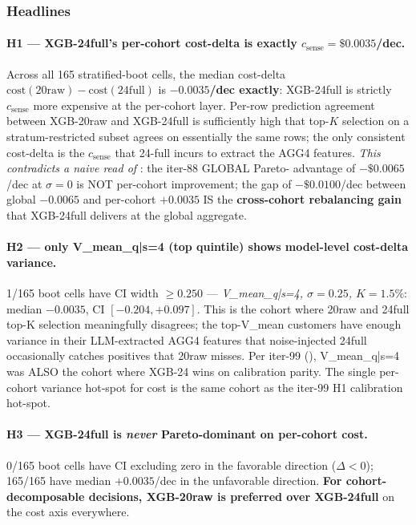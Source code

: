 \subsubsection{Headlines}

\paragraph{H1 --- XGB-24full's per-cohort cost-delta is exactly $c_\text{sense}{=}\$0.0035$/dec.}
Across all 165 stratified-boot cells, the median cost-delta
$\mathrm{cost}(\text{20raw}) - \mathrm{cost}(\text{24full})$ is
\textbf{$-0.0035$/dec exactly}: XGB-24full is strictly $c_\text{sense}$
more expensive at the per-cohort layer. Per-row prediction agreement
between XGB-20raw and XGB-24full is sufficiently high that top-$K$
selection on a stratum-restricted subset agrees on essentially the same
rows; the only consistent cost-delta is the $c_\text{sense}$ that 24-full
incurs to extract the AGG4 features. \emph{This contradicts a naive read
of} : the iter-88 GLOBAL Pareto-
advantage of $-\$0.0065$/dec at $\sigma {=} 0$ is NOT per-cohort
improvement; the gap of $-\$0.0100$/dec between global $-0.0065$ and
per-cohort $+0.0035$ IS the \textbf{cross-cohort rebalancing gain} that
XGB-24full delivers at the global aggregate.

\paragraph{H2 --- only V\_mean\_q|s{=}4 (top quintile) shows model-level cost-delta variance.}
1/165 boot cells have CI width $\ge 0.250$ — \emph{V\_mean\_q|s=4,
$\sigma{=}0.25$, $K{=}1.5\%$}: median $-0.0035$, CI $[-0.204, +0.097]$.
This is the cohort where 20raw and 24full top-K selection meaningfully
disagrees; the top-V\_mean customers have enough variance in their
LLM-extracted AGG4 features that noise-injected 24full occasionally
catches positives that 20raw misses. Per iter-99
(), V\_mean\_q|s=4 was ALSO the
cohort where XGB-24 wins on calibration parity. The single per-cohort
variance hot-spot for cost is the same cohort as the iter-99 H1 calibration
hot-spot.

\paragraph{H3 --- XGB-24full is \emph{never} Pareto-dominant on per-cohort cost.}
0/165 boot cells have CI excluding zero in the favorable direction
($\Delta < 0$); 165/165 have median $+0.0035$/dec in the unfavorable
direction. \textbf{For cohort-decomposable decisions, XGB-20raw is
preferred over XGB-24full} on the cost axis everywhere.

